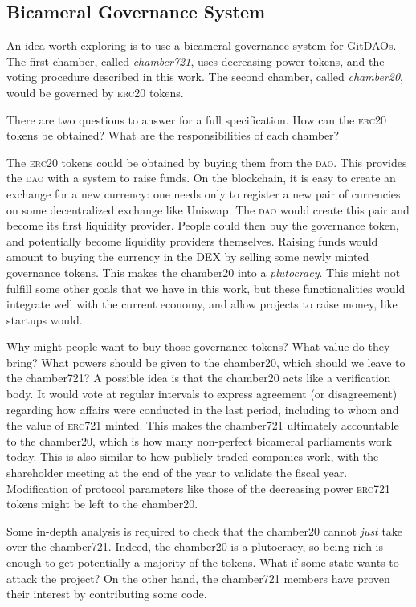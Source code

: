 \subsection{Bicameral Governance System}

An idea worth exploring is to use a bicameral governance system for GitDAOs.
The first chamber, called \emph{chamber721}, uses decreasing power tokens, and the voting procedure described in this work.
The second chamber, called \emph{chamber20}, would be governed by \textsc{erc20} tokens.

There are two questions to answer for a full specification.
How can the \textsc{erc20} tokens be obtained?
What are the responsibilities of each chamber?

The \textsc{erc20} tokens could be obtained by buying them from the \textsc{dao}.
This provides the \textsc{dao} with a system to raise funds.
On the blockchain, it is easy to create an exchange for a new currency: one needs only to register a new pair of currencies on some decentralized exchange like Uniswap.
The \textsc{dao} would create this pair and become its first liquidity provider.
People could then buy the governance token, and potentially become liquidity providers themselves.
Raising funds would amount to buying the currency in the DEX by selling some newly minted governance tokens.
This makes the chamber20 into a \emph{plutocracy}.
This might not fulfill some other goals that we have in this work, but these functionalities would integrate well with the current economy, and allow projects to raise money, like startups would.

Why might people want to buy those governance tokens?
What value do they bring?
What powers should be given to the chamber20, which should we leave to the chamber721?
A possible idea is that the chamber20 acts like a verification body.
It would vote at regular intervals to express agreement (or disagreement) regarding how affairs were conducted in the last period, including to whom and the value of \textsc{erc721} minted.
This makes the chamber721 ultimately accountable to the chamber20, which is how many non-perfect bicameral parliaments work today.
This is also similar to how publicly traded companies work, with the shareholder meeting at the end of the year to validate the fiscal year.
Modification of protocol parameters like those of the decreasing power \textsc{erc721} tokens might be left to the chamber20.

Some in-depth analysis is required to check that the chamber20 cannot \emph{just} take over the chamber721.
Indeed, the chamber20 is a plutocracy, so being rich is enough to get potentially a majority of the tokens.
What if some state wants to attack the project?
On the other hand, the chamber721 members have proven their interest by contributing some code.

